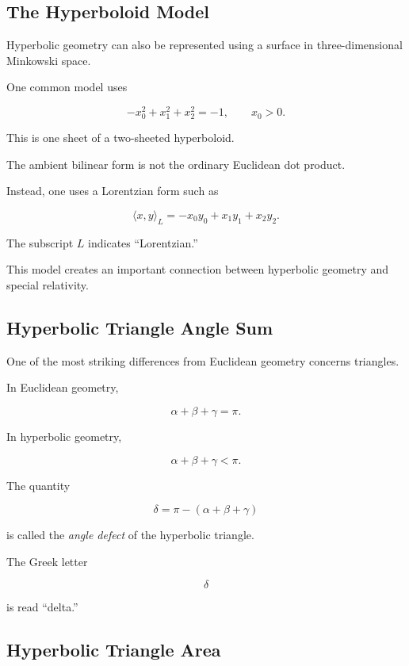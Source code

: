 \subsection{The Hyperboloid Model}
\label{subsec:hyperboloid-model}

Hyperbolic geometry can also be represented using a surface in
three-dimensional Minkowski space.

One common model uses

\[
\boxed{
-x_0^2+x_1^2+x_2^2=-1,
\qquad
x_0>0.
}
\]

This is one sheet of a two-sheeted hyperboloid.

The ambient bilinear form is not the ordinary Euclidean dot product.

Instead, one uses a Lorentzian form such as

\[
\boxed{
\langle x,y\rangle_L
=
-x_0y_0+x_1y_1+x_2y_2.
}
\]

The subscript \(L\) indicates ``Lorentzian.''

This model creates an important connection between hyperbolic geometry and
special relativity.

\subsection{Hyperbolic Triangle Angle Sum}
\label{subsec:hyperbolic-triangle-angle-sum}

One of the most striking differences from Euclidean geometry concerns
triangles.

In Euclidean geometry,

\[
\alpha+\beta+\gamma=\pi.
\]

In hyperbolic geometry,

\[
\boxed{
\alpha+\beta+\gamma<\pi.
}
\]

The quantity

\[
\boxed{
\delta
=
\pi-(\alpha+\beta+\gamma)
}
\]

is called the \emph{angle defect} of the hyperbolic triangle.

The Greek letter

\[
\delta
\]

is read ``delta.''

\subsection{Hyperbolic Triangle Area}
\label{subsec:hyperbolic-triangle-area}


